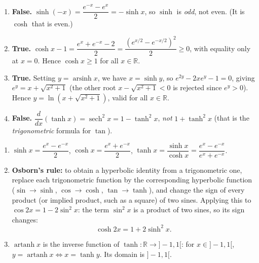 \documentclass[11pt]{article}
\begin{document}
\begin{corrige}
\begin{enumerate}
\item \textbf{False.} $\sinh(-x) = \dfrac{e^{-x} - e^{x}}{2} = -\sinh x$, so $\sinh$ is \emph{odd}, not even. (It is $\cosh$ that is even.)
\item \textbf{True.} $\cosh x - 1 = \dfrac{e^x + e^{-x} - 2}{2} = \dfrac{(e^{x/2} - e^{-x/2})^2}{2} \geq 0$, with equality only at $x = 0$. Hence $\cosh x \geq 1$ for all $x \in \mathbb{R}$.
\item \textbf{True.} Setting $y = \operatorname{arsinh} x$, we have $x = \sinh y$, so $e^{2y} - 2xe^y - 1 = 0$, giving $e^y = x + \sqrt{x^2+1}$ (the other root $x - \sqrt{x^2+1} < 0$ is rejected since $e^y > 0$). Hence $y = \ln\!\left(x + \sqrt{x^2+1}\right)$, valid for all $x \in \mathbb{R}$.
\item \textbf{False.} $\dfrac{d}{dx}(\tanh x) = \operatorname{sech}^2 x = 1 - \tanh^2 x$, \emph{not} $1 + \tanh^2 x$ (that is the \emph{trigonometric} formula for $\tan$).
\end{enumerate}
\end{corrige}

\begin{corrige}
\begin{enumerate}
\item $\sinh x = \dfrac{e^x - e^{-x}}{2}$, \quad $\cosh x = \dfrac{e^x + e^{-x}}{2}$, \quad $\tanh x = \dfrac{\sinh x}{\cosh x} = \dfrac{e^x - e^{-x}}{e^x + e^{-x}}$.
\item \textbf{Osborn's rule:} to obtain a hyperbolic identity from a trigonometric one, replace each trigonometric function by the corresponding hyperbolic function ($\sin \to \sinh$, $\cos \to \cosh$, $\tan \to \tanh$), and change the sign of every product (or implied product, such as a square) of two sines. Applying this to $\cos 2x = 1 - 2\sin^2 x$: the term $\sin^2 x$ is a product of two sines, so its sign changes:
\[ \cosh 2x = 1 + 2\sinh^2 x. \]
\item $\operatorname{artanh} x$ is the inverse function of $\tanh : \mathbb{R} \to ]-1, 1[$: for $x \in ]-1, 1[$, $y = \operatorname{artanh} x \iff x = \tanh y$. Its domain is $]-1, 1[$.
\end{enumerate}
\end{corrige}
\end{document}
